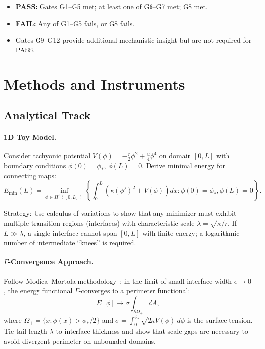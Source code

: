 \documentclass{article}
\begin{document}
\begin{itemize}[noitemsep]
\item \textbf{PASS:} Gates G1--G5 met; at least one of G6--G7 met; G8 met.
\item \textbf{FAIL:} Any of G1--G5 fails, or G8 fails.
\item Gates G9--G12 provide additional mechanistic insight but are not required for PASS.
\end{itemize}

\section{Methods and Instruments}
\label{sec:methods}

\subsection*{Analytical Track}

\paragraph{1D Toy Model.}
Consider tachyonic potential $V(\phi) = -\frac{r}{2}\phi^2 + \frac{u}{4}\phi^4$ on domain $[0,L]$ with boundary conditions $\phi(0) = \phi_\ast$, $\phi(L) = 0$. Derive minimal energy for connecting maps:
\begin{equation}
E_{\min}(L) = \inf_{\phi \in H^1([0,L])} \left\{ \int_0^L \left( \kappa (\phi')^2 + V(\phi) \right) dx : \phi(0) = \phi_\ast, \phi(L) = 0 \right\}.
\end{equation}

Strategy: Use calculus of variations to show that any minimizer must exhibit multiple transition regions (interfaces) with characteristic scale $\lambda = \sqrt{\kappa/r}$. If $L \gg \lambda$, a single interface cannot span $[0,L]$ with finite energy; a logarithmic number of intermediate ``knees'' is required.

\paragraph{$\Gamma$-Convergence Approach.}
Follow Modica--Mortola methodology~\cite{modica1977gradient}: in the limit of small interface width $\epsilon \to 0$, the energy functional $\Gamma$-converges to a perimeter functional:
\begin{equation}
E[\phi] \to \sigma \int_{\partial\Omega_+} dA,
\end{equation}
where $\Omega_+ = \{x : \phi(x) > \phi_\ast/2\}$ and $\sigma = \int_{0}^{\phi_\ast} \sqrt{2\kappa V(\phi)}\, d\phi$ is the surface tension. Tie tail length $\lambda$ to interface thickness and show that scale gaps are necessary to avoid divergent perimeter on unbounded domains.
\end{document}
